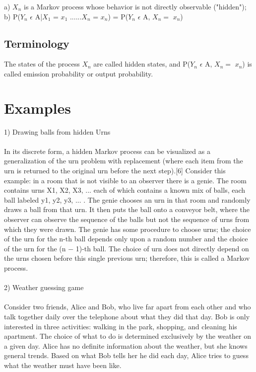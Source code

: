 \documentclass[a4paper,10pt]{article} %
\begin{document}
a) $X_n$ is a Markov process whose behavior is not directly observable ("hidden");\\
b) P($Y_n$ $\epsilon $ A|$X_1$ = $x_1$ ......$X_n$ = $x_n$) = P($Y_n$ $\epsilon $ A, $X_n=$ $x_n$)\\
\subsection{Terminology}
The states of the process $X_{n}$ are called hidden states, and  P($Y_n$ $\epsilon $ A, $X_n=$ $x_n$)  is called emission probability or output probability.
\section{Examples}
1) Drawing balls from hidden Urns\\
\\In its discrete form, a hidden Markov process can be visualized as a generalization of the urn problem with replacement (where each item from the urn is returned to the original urn before the next step).[6] Consider this example: in a room that is not visible to an observer there is a genie. The room contains urns X1, X2, X3, ... each of which contains a known mix of balls, each ball labeled y1, y2, y3, ... . The genie chooses an urn in that room and randomly draws a ball from that urn. It then puts the ball onto a conveyor belt, where the observer can observe the sequence of the balls but not the sequence of urns from which they were drawn. The genie has some procedure to choose urns; the choice of the urn for the n-th ball depends only upon a random number and the choice of the urn for the (n − 1)-th ball. The choice of urn does not directly depend on the urns chosen before this single previous urn; therefore, this is called a Markov process.\\\\

2) Weather guessing game\\
\\Consider two friends, Alice and Bob, who live far apart from each other and who talk together daily over the telephone about what they did that day. Bob is only interested in three activities: walking in the park, shopping, and cleaning his apartment. The choice of what to do is determined exclusively by the weather on a given day. Alice has no definite information about the weather, but she knows general trends. Based on what Bob tells her he did each day, Alice tries to guess what the weather must have been like.
\end{document}
